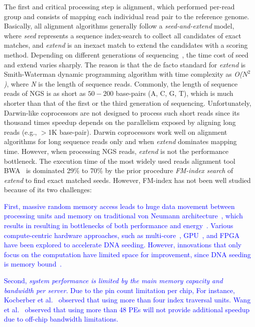 \documentclass[9pt,conference]{IEEEtran}
\begin{document}
The first and critical processing step is alignment, which performed per-read group and consists of mapping each individual read pair to the reference genome. Basically, all alignment algorithms generally follow a \textit{seed-and-extend} model, where \textit{seed} represents a sequence index-search to collect all candidates of exact matches, and \textit{extend} is an inexact match to extend the candidates with a scoring method. 
Depending on different generations of sequencing~\cite{}, the time cost of seed and extend varies sharply. 
The reason is that the de facto standard for \textit{extend} is Smith-Waterman dynamic programming algorithm with time complexity as \textit{\textit{O}($N^2$)}, where \textit{N} is the length of sequence reads. 
Commonly, the length of sequence reads of NGS is as short as $50 - 200$ base-pairs (A, C, G, T), which is much shorter than that of the first or the third generation of sequencing. 
Unfortunately, Darwin-like coprocessors are not designed to process such short reads since its thousand times speedup depends on the parallelism exposed by aligning long reads (e.g., $>$1K base-pair). Darwin coprocessors work well on alignment algorithms for long sequence reads only and when \textit{extend} dominates mapping time.
However, when processing NGS reads, \textit{extend} is not the performance bottleneck. 
The execution time of the most widely used reads alignment tool BWA~\cite{li2013aligning} is dominated 29\% to 70\% by the prior procedure \textit{FM-index search} of \textit{extend} to find exact matched seeds. However, FM-index has not been well studied because of its two challenges: 

\textcolor{blue}{
First, massive random memory access leads to huge data movement between processing units and memory on traditional von Neumann architecture~\cite{}, which results in resulting in bottlenecks of both performance and energy~\cite{}. Various compute-centric hardware approaches, such as multi-core~\cite{}, GPU~\cite{}, and FPGA~\cite{} have been explored to accelerate DNA seeding. However, innovations that only focus on the computation have limited space for improvement, since DNA seeding is memory bound~\cite{}. 
}

\textcolor{blue}{
Second, \textit{system performance is limited by the main memory capacity and bandwidth per server.} Due to the pin count limitation per chip, For instance, Kocberber et al.~\cite{Kocberber:2013bb} observed that using more than four index traversal units. Wang et al.~\cite{yuanrong} observed that using more than 48 PEs will not provide additional speedup due to off-chip bandwidth limitations.
}
\end{document}
